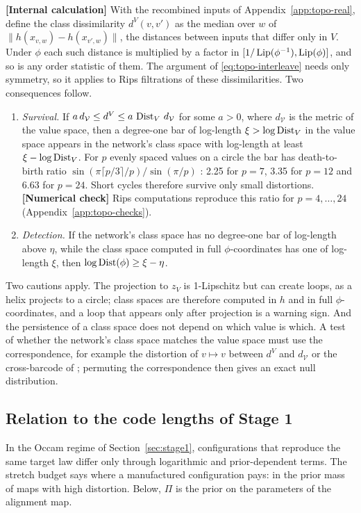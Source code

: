 \documentclass[11pt,a4paper]{article}
\newcommand{\evl}[2]{{\small\bfseries\color{#1}[#2]}}
\newcommand{\LCalc}{\evl{ccalc}{Internal calculation}}
\newcommand{\LNum}{\evl{cnum}{Numerical check}}
\begin{document}
\LCalc{} With the recombined inputs of Appendix~\ref{app:topo-real}, define
the class dissimilarity $d^V(v,v')$ as the median over $w$ of
$\|h(x_{v,w})-h(x_{v',w})\|$, the distances between inputs that differ only
in $V$. Under $\phi$ each such distance is multiplied by a factor in
$[1/\operatorname{Lip}(\phi^{-1}),\operatorname{Lip}(\phi)]$, and so is any order statistic of them. The
argument of \eqref{eq:topo-interleave} needs only symmetry, so it applies to
Rips filtrations of these dissimilarities. Two consequences follow.
\begin{enumerate}[leftmargin=*]
\item \emph{Survival.} If $a\,d_{\mathcal V}\le d^V\le a\,\operatorname{Dist}_V\,d_{\mathcal V}$
for some $a>0$, where $d_{\mathcal V}$ is the metric of the value space, then
a degree-one bar of log-length $\xi>\log\operatorname{Dist}_V$ in the value space appears
in the network's class space with log-length at least $\xi-\log\operatorname{Dist}_V$. For $p$
evenly spaced values on a circle the bar has death-to-birth ratio
$\sin(\pi\lceil p/3\rceil/p)/\sin(\pi/p)$ \cite{adamaszek2017}: 2.25 for
$p=7$, 3.35 for $p=12$ and 6.63 for $p=24$. Short cycles therefore survive
only small distortions. \LNum{} Rips computations reproduce this ratio for
$p=4,\dots,24$ (Appendix~\ref{app:topo-checks}).
\item \emph{Detection.} If the network's class space has no degree-one bar of
log-length above $\eta$, while the class space computed in full
$\phi$-coordinates has one of log-length $\xi$, then
$\log\operatorname{Dist}(\phi)\ge\xi-\eta$.
\end{enumerate}
Two cautions apply. The projection to $z_V$ is 1-Lipschitz but can create
loops, as a helix projects to a circle; class spaces are therefore computed in
$h$ and in full $\phi$-coordinates, and a loop that appears only after
projection is a warning sign. And the persistence of a class space does not
depend on which value is which. A test of whether the network's class space
matches the value space must use the correspondence, for example the
distortion of $v\mapsto v$ between $d^V$ and $d_{\mathcal V}$ or the
cross-barcode of \cite{barannikov2022}; permuting the correspondence then
gives an exact null distribution.

\subsection{Relation to the code lengths of Stage 1}
\label{app:topo-codes}

In the Occam regime of Section~\ref{sec:stage1}, configurations that reproduce
the same target law differ only through logarithmic and prior-dependent
terms. The stretch budget says where a manufactured configuration pays: in
the prior mass of maps with high distortion. Below, $\Pi$ is the prior on the
parameters of the alignment map.
\end{document}
